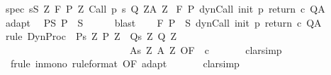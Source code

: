 \begin{isabellebody}
\ spec{\isacharcolon}\ {\isachardoublequoteopen}{\isasymforall}s{\isasymin}S{\isachardot}\ {\isasymforall}Z{\isachardot}\ {\isasymGamma}{\isacharcomma}{\isasymTheta}{\isasymturnstile}\isactrlbsub {\isacharslash}F\isactrlesub \ {\isacharparenleft}P{\isacharprime}\ Z{\isacharparenright}\ Call\ {\isacharparenleft}p\ s{\isacharparenright}\ {\isacharparenleft}Q{\isacharprime}\ Z{\isacharparenright}{\isacharcomma}{\isacharparenleft}A{\isacharprime}\ Z{\isacharparenright}{\isachardoublequoteclose}\isanewline
{}\ {\isachardoublequoteopen}{\isasymGamma}{\isacharcomma}{\isasymTheta}{\isasymturnstile}\isactrlbsub {\isacharslash}F\isactrlesub \ P\ {\isacharparenleft}dynCall\ init\ p\ return\ c{\isacharparenright}\ Q{\isacharcomma}A{\isachardoublequoteclose}\isanewline
%
\isadelimproof
%
\endisadelimproof
%
\isatagproof
{}\isamarkupfalse%
\ {\isacharminus}\isanewline
\ \ \isamarkupfalse%
\ adapt\ \isamarkupfalse%
\ P{\isacharunderscore}S{\isacharcolon}\ {\isachardoublequoteopen}P\ {\isasymsubseteq}\ S{\isachardoublequoteclose}\isanewline
\ \ \ \ \isamarkupfalse%
\ blast\isanewline
\ \ \isamarkupfalse%
\ {\isachardoublequoteopen}{\isasymGamma}{\isacharcomma}{\isasymTheta}{\isasymturnstile}\isactrlbsub {\isacharslash}F\isactrlesub \ {\isacharparenleft}P\ {\isasyminter}\ S{\isacharparenright}\ {\isacharparenleft}dynCall\ init\ p\ return\ c{\isacharparenright}\ Q{\isacharcomma}A{\isachardoublequoteclose}\isanewline
\ \ \ \ \isamarkupfalse%
\ {\isacharparenleft}rule\ DynProc\ {\isacharbrackleft}\ P{\isacharprime}{\isacharequal}{\isachardoublequoteopen}{\isasymlambda}s\ Z{\isachardot}\ P{\isacharprime}\ Z{\isachardoublequoteclose}\ \ Q{\isacharprime}{\isacharequal}{\isachardoublequoteopen}{\isasymlambda}s\ Z{\isachardot}\ Q{\isacharprime}\ Z{\isachardoublequoteclose}\ \isanewline
\ \ \ \ \ \ \ \ \ \ \ \ \ \ \ \ \ \ \ \ \ \ \ \ \ \ A{\isacharprime}{\isacharequal}{\isachardoublequoteopen}{\isasymlambda}s\ Z{\isachardot}\ A{\isacharprime}\ Z{\isachardoublequoteclose}{\isacharcomma}\ OF\ {\isacharunderscore}\ c{\isacharbrackright}{\isacharparenright}\isanewline
\ \ \ \ \isamarkupfalse%
\ \ clarsimp\isanewline
\ \ \ \ \isamarkupfalse%
\ \ {\isacharparenleft}frule\ in{\isacharunderscore}mono\ {\isacharbrackleft}rule{\isacharunderscore}format{\isacharcomma}\ OF\ adapt{\isacharbrackright}{\isacharparenright}\isanewline
\ \ \ \ \isamarkupfalse%
\ \ clarsimp\isanewline

\end{isabellebody}

